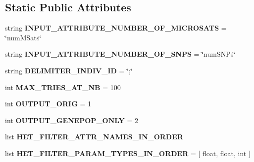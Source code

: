\subsection*{Static Public Attributes}
\begin{DoxyCompactItemize}
\item 
string {\bfseries I\+N\+P\+U\+T\+\_\+\+A\+T\+T\+R\+I\+B\+U\+T\+E\+\_\+\+N\+U\+M\+B\+E\+R\+\_\+\+O\+F\+\_\+\+M\+I\+C\+R\+O\+S\+A\+TS} = \char`\"{}num\+M\+Sats\char`\"{}\hypertarget{classnegui_1_1pgopsimupop_1_1PGOpSimuPop_afad9fd5e836335f749ae96a958d3786e}{}\label{classnegui_1_1pgopsimupop_1_1PGOpSimuPop_afad9fd5e836335f749ae96a958d3786e}

\item 
string {\bfseries I\+N\+P\+U\+T\+\_\+\+A\+T\+T\+R\+I\+B\+U\+T\+E\+\_\+\+N\+U\+M\+B\+E\+R\+\_\+\+O\+F\+\_\+\+S\+N\+PS} = \char`\"{}num\+S\+N\+Ps\char`\"{}\hypertarget{classnegui_1_1pgopsimupop_1_1PGOpSimuPop_ac0c65641439fe744a0b62bd037145b3b}{}\label{classnegui_1_1pgopsimupop_1_1PGOpSimuPop_ac0c65641439fe744a0b62bd037145b3b}

\item 
string {\bfseries D\+E\+L\+I\+M\+I\+T\+E\+R\+\_\+\+I\+N\+D\+I\+V\+\_\+\+ID} = \char`\"{};\char`\"{}\hypertarget{classnegui_1_1pgopsimupop_1_1PGOpSimuPop_a23ef02f2da1b42907e37ba9d493a835a}{}\label{classnegui_1_1pgopsimupop_1_1PGOpSimuPop_a23ef02f2da1b42907e37ba9d493a835a}

\item 
int {\bfseries M\+A\+X\+\_\+\+T\+R\+I\+E\+S\+\_\+\+A\+T\+\_\+\+NB} = 100\hypertarget{classnegui_1_1pgopsimupop_1_1PGOpSimuPop_a096ef7273b73e622aa644cf414091e8e}{}\label{classnegui_1_1pgopsimupop_1_1PGOpSimuPop_a096ef7273b73e622aa644cf414091e8e}

\item 
int {\bfseries O\+U\+T\+P\+U\+T\+\_\+\+O\+R\+IG} = 1\hypertarget{classnegui_1_1pgopsimupop_1_1PGOpSimuPop_a39fc9930957fcdabd3172ca8b8d4f7f5}{}\label{classnegui_1_1pgopsimupop_1_1PGOpSimuPop_a39fc9930957fcdabd3172ca8b8d4f7f5}

\item 
int {\bfseries O\+U\+T\+P\+U\+T\+\_\+\+G\+E\+N\+E\+P\+O\+P\+\_\+\+O\+N\+LY} = 2\hypertarget{classnegui_1_1pgopsimupop_1_1PGOpSimuPop_aff9fc97a188a9da07d1af2a63b81ed10}{}\label{classnegui_1_1pgopsimupop_1_1PGOpSimuPop_aff9fc97a188a9da07d1af2a63b81ed10}

\item 
list {\bfseries H\+E\+T\+\_\+\+F\+I\+L\+T\+E\+R\+\_\+\+A\+T\+T\+R\+\_\+\+N\+A\+M\+E\+S\+\_\+\+I\+N\+\_\+\+O\+R\+D\+ER}
\item 
list {\bfseries H\+E\+T\+\_\+\+F\+I\+L\+T\+E\+R\+\_\+\+P\+A\+R\+A\+M\+\_\+\+T\+Y\+P\+E\+S\+\_\+\+I\+N\+\_\+\+O\+R\+D\+ER} = \mbox{[} float, float, int \mbox{]}\hypertarget{classnegui_1_1pgopsimupop_1_1PGOpSimuPop_a1d27a327377ba81bbf8ef734015d0357}{}\label{classnegui_1_1pgopsimupop_1_1PGOpSimuPop_a1d27a327377ba81bbf8ef734015d0357}


\end{DoxyCompactItemize}
